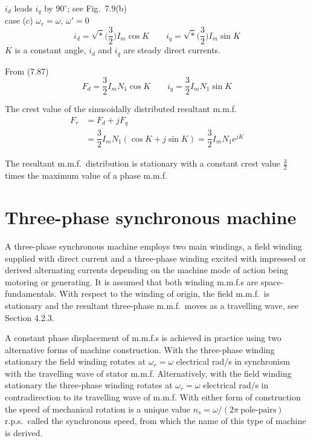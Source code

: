 \documentclass[a4paper,numbers=noenddot,12pt]{scrbook}
\begin{document}
        $i_d$ leads $i_q$ by $90^{\circ}$; see Fig.\ 7.9(b) \\
        case ($c$) $\omega_r = \omega$, $\omega' = 0$
        \begin{equation*}
            i_d = \sqrt*{\Big( \dfrac{3}{2} \Big)} I_m \cos K \qquad i_q = \sqrt*{\Big( \dfrac{3}{2} \Big)} I_m \sin K
        \end{equation*}
        $K$ is a constant angle, $i_d$ and $i_q$ are steady direct currents.

        From (7.87)
        \begin{equation*}
            F_d = \dfrac{3}{2} I_m N_1 \cos K \qquad i_q = \dfrac{3}{2} I_m N_1 \sin K
        \end{equation*}

        The crest value of the sinusoidally distributed resultant m.m.f.
        \begin{align*}
            F_r & = F_d + jF_q\\
            & = \dfrac{3}{2} I_m N_1 (\cos K + j \sin K) = \dfrac{3}{2} I_m N_1 e^{jK}
        \end{align*}

        The resultant m.m.f.\ distribution is stationary with a constant crest value $\frac{3}{2}$ times the maximum value of a phase m.m.f.
        \chapter{Three-phase synchronous machine}

        A three-phase synchronous machine employs two main windings, a field winding supplied with direct current and a three-phase winding excited with impressed or derived alternating currents depending on the machine mode of action being motoring or generating. It is assumed that both winding m.m.f.s are space-fundamentals. With respect to the winding of origin, the field m.m.f.\ is stationary and the resultant three-phase m.m.f.\ moves as a travelling wave, see Section 4.2.3.

        A constant phase displacement of m.m.f.s is achieved in practice using two alternative forms of machine construction. With the three-phase winding stationary the field winding rotates at $\omega_r = \omega$ electrical rad/s in synchronism with the travelling wave of stator m.m.f. Alternatively, with the field winding stationary the three-phase winding rotates at $\omega_r = \omega$ electrical rad/s in contradirection to its travelling wave of m.m.f. With either form of construction the speed
        of mechanical rotation is a unique value $n_s = \omega / (2 \pi\ \text{pole-pairs})$ r.p.s.\ called the synchronous speed, from which the name of this type of machine is derived.
\end{document}
